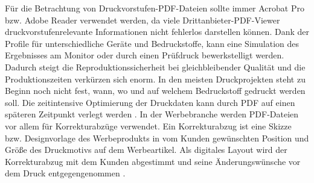 Für die Betrachtung von Druckvorstufen-PDF-Dateien sollte immer Acrobat Pro bzw. Adobe Reader verwendet werden, da viele Drittanbieter-PDF-Viewer druckvorstufenrelevante Informationen nicht fehlerlos darstellen können. Dank der Profile für unterschiedliche Geräte und Bedruckstoffe, kann eine Simulation des Ergebnisses am Monitor oder durch einen Prüfdruck bewerkstelligt werden. Dadurch steigt die Reproduktionssicherheit bei gleichbleibender Qualität und die Produktionszeiten verkürzen sich enorm. In den meisten Druckprojekten steht zu Beginn noch nicht fest, wann, wo und auf welchem Bedruckstoff gedruckt werden soll. Die zeitintensive Optimierung der Druckdaten kann durch PDF auf einen späteren Zeitpunkt verlegt werden \cite{schneeberger}.
In der Werbebranche werden PDF-Dateien vor allem für Korrekturabzüge verwendet. Ein Korrekturabzug ist eine Skizze bzw. Designvorlage des Werbeprodukts in vom Kunden gewünschten Position und Größe des Druckmotivs auf dem Werbeartikel. Als digitales Layout wird der Korrekturabzug mit dem Kunden abgestimmt und seine Änderungswünsche vor dem Druck entgegengenommen \cite{korrektur}.
